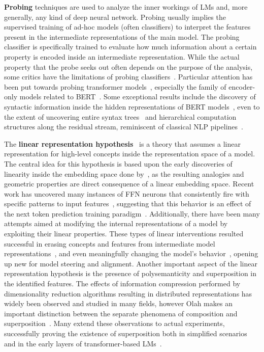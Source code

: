 \textbf{Probing} techniques are used to analyze the inner workings of LMs and, more generally, any kind of deep neural network.
Probing usually implies the supervised training of ad-hoc models (often classifiers) to interpret the features present in the intermediate representations of the main model.
The probing classifier is specifically trained to evaluate how much information about a certain property is encoded inside an intermediate representation.
While the actual property that the probe seeks out often depends on the purpose of the analysis, some critics have  the limitations of probing classifiers~\cite{belinkov2022}.
Particular attention has been put towards probing transformer models~\cite{chwang2024, zou2023, macdiarmid2024, burns2023}, especially the family of encoder-only models related to BERT~\cite{devlin2019}.
Some exceptional results include the discovery of syntactic information inside the hidden representations of BERT models~\cite{tenney2019a, lin2019, liu2019}, even to the extent of uncovering entire syntax trees~\cite{hewitt2019} and hierarchical computation structures along the residual stream, reminiscent of classical NLP pipelines~\cite{tenney2019b}.


The \textbf{linear representation hypothesis}~\cite{park2023} is a theory that assumes a linear representation for high-level concepts inside the representation space of a model.
The central idea for this hypothesis is based upon the early discoveries of linearity inside the embedding space done by~\citet{mikolov2013}, as the resulting analogies and geometric properties are direct consequence of a linear embedding space.
Recent work has uncovered many instances of FFN neurons that consistently fire with specific patterns  to input features~\cite{voita2024}, suggesting that this behavior is an effect of the next token prediction training paradigm~\cite{jiang2024}.
Additionally, there have been many attempts aimed at modifying the internal representations of a model by exploiting their linear properties.
These types of linear interventions resulted successful in erasing concepts and features from intermediate model representations~\cite{ravfogel2020, ravfogel2022, belrose2023b}, and even meaningfully changing the model's behavior~\cite{nanda2023, belrose2023b}, opening up new  for model steering and alignment. 
Another important aspect of the linear representation hypothesis is the presence of polysemanticity and superposition in the identified features.
The effects of information compression performed by dimensionality reduction algorithms resulting in distributed representations has widely been observed and studied in many fields, however Olah makes an important distinction between the separate phenomena of composition and superposition~\cite{olah2023}.
Many extend these observations to actual experiments, successfully proving the existence of superposition both in simplified scenarios~\cite{elhage2022, arora2018} and in the early layers of transformer-based LMs~\cite{gurnee2023}.

